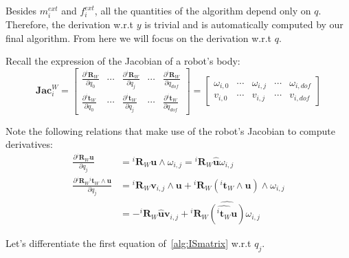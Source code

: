 Besides $m_i^{ext}$ and $f_i^{ext}$, all the quantities of the algorithm depend only on $q$.
Therefore, the derivation w.r.t $y$ is trivial and is automatically computed by our final algorithm.
From here we will focus on the derivation w.r.t $q$.

Recall the expression of the Jacobian of a robot's body:
\begin{equation}
  \mathbf{Jac}^W_i =
  \begin{bmatrix}
    \frac{\partial {}^i\mathbf{R}_W}{\partial q_0} & \cdots &
    \frac{\partial {}^i\mathbf{R}_W}{\partial q_j} & \cdots &
    \frac{\partial {}^i\mathbf{R}_W}{\partial q_{dof}} \\
    \frac{\partial {}^i\mathbf{t}_W}{\partial q_0} & \cdots &
    \frac{\partial {}^i\mathbf{t}_W}{\partial q_j} & \cdots &
    \frac{\partial {}^i\mathbf{t}_W}{\partial q_{dof}}
  \end{bmatrix}
=
  \begin{bmatrix}
    \omega_{i,0} & \cdots &
    \omega_{i,j} & \cdots &
    \omega_{i,dof} \\
    v_{i,0} & \cdots &
    v_{i,j} & \cdots &
    v_{i,dof}
  \end{bmatrix}
\end{equation}

Note the following relations that make use of the robot's Jacobian to compute derivatives:
\begin{align}
  \frac{\partial {}^i\mathbf{R}_W \mathbf{u}}{\partial q_j}
  &= {}^i\mathbf{R}_W \mathbf{u} \wedge \omega_{i,j}
  = {}^i\mathbf{R}_W \widehat{\mathbf{u}} \omega_{i,j}
  \\
  \frac{\partial {}^i\mathbf{R}_W {}^i\mathbf{t}_W\wedge \mathbf{u}}{\partial q_j}
  &= {}^i\mathbf{R}_W \mathbf{v}_{i,j} \wedge \mathbf{u}
  + {}^i\mathbf{R}_W \left({}^i\mathbf{t}_W\wedge\mathbf{u}\right) \wedge \omega_{i,j}\\
  &= -{}^i\mathbf{R}_W \widehat{\mathbf{u}} \mathbf{v}_{i,j}
  + {}^i\mathbf{R}_W \widehat{\left(\widehat{{}^i\mathbf{t}_W}\mathbf{u}\right)} \omega_{i,j}
\end{align}

Let's differentiate the first equation of~\ref{alg:ISmatrix} w.r.t $q_j$.

